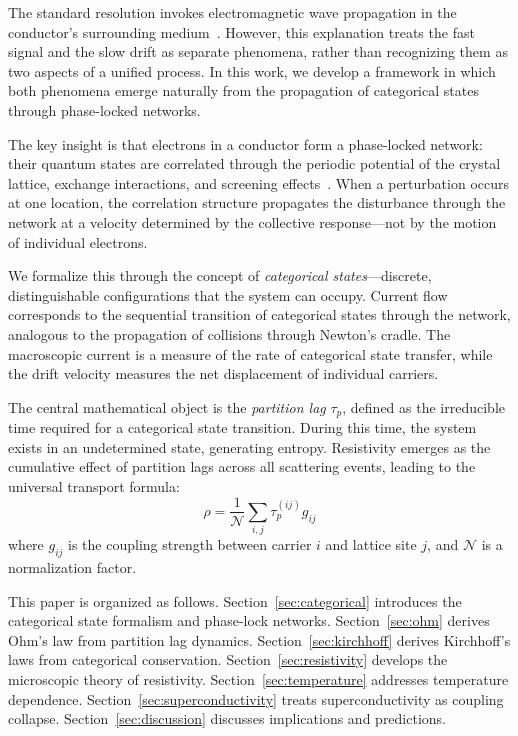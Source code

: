 \documentclass[twocolumn,showpacs,preprintnumbers,amsmath,amssymb,prd]{revtex4-2}
\newcommand{\taup}{\tau_p}
\begin{document}
The standard resolution invokes electromagnetic wave propagation in the conductor's surrounding medium~\cite{Jackson1999}. However, this explanation treats the fast signal and the slow drift as separate phenomena, rather than recognizing them as two aspects of a unified process. In this work, we develop a framework in which both phenomena emerge naturally from the propagation of categorical states through phase-locked networks.

The key insight is that electrons in a conductor form a phase-locked network: their quantum states are correlated through the periodic potential of the crystal lattice, exchange interactions, and screening effects~\cite{Ashcroft1976}. When a perturbation occurs at one location, the correlation structure propagates the disturbance through the network at a velocity determined by the collective response---not by the motion of individual electrons.

We formalize this through the concept of \emph{categorical states}---discrete, distinguishable configurations that the system can occupy. Current flow corresponds to the sequential transition of categorical states through the network, analogous to the propagation of collisions through Newton's cradle. The macroscopic current is a measure of the rate of categorical state transfer, while the drift velocity measures the net displacement of individual carriers.

The central mathematical object is the \emph{partition lag} $\taup$, defined as the irreducible time required for a categorical state transition. During this time, the system exists in an undetermined state, generating entropy. Resistivity emerges as the cumulative effect of partition lags across all scattering events, leading to the universal transport formula:
\begin{equation}
\rho = \frac{1}{\mathcal{N}} \sum_{i,j} \taup^{(ij)} g_{ij}
\label{eq:universal_resistivity_intro}
\end{equation}
where $g_{ij}$ is the coupling strength between carrier $i$ and lattice site $j$, and $\mathcal{N}$ is a normalization factor.

This paper is organized as follows. Section~\ref{sec:categorical} introduces the categorical state formalism and phase-lock networks. Section~\ref{sec:ohm} derives Ohm's law from partition lag dynamics. Section~\ref{sec:kirchhoff} derives Kirchhoff's laws from categorical conservation. Section~\ref{sec:resistivity} develops the microscopic theory of resistivity. Section~\ref{sec:temperature} addresses temperature dependence. Section~\ref{sec:superconductivity} treats superconductivity as coupling collapse. Section~\ref{sec:discussion} discusses implications and predictions.
\end{document}

